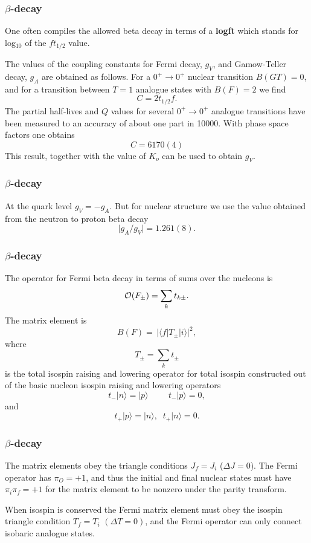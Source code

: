 \documentclass{beamer}
\begin{document}
\begin{frame}
\frametitle{$\beta$-decay}

\begin{block}{}
One often compiles the allowed beta decay in terms of a \textbf{logft}
which stands for log$_{10}$ of the $ft_{1/2}$ value.

     The values of the coupling constants for Fermi decay,
$g_{V}$, and Gamow-Teller decay, $g_{A}$ are obtained as follows.
For a $0^{+} \rightarrow  0^{+}$ nuclear transition $B(GT)=0$, and for a
transition between $  T=1  $ analogue states with $B(F)=2$ we find 
\[
       C = 2 t_{1/2} f.  
\]
The partial half-lives and $Q$ values for several $0^{+} \rightarrow  0^{+}$ analogue
transitions have been measured to an accuracy of about one part in
10000. With  phase space factors one obtains 
\[
      C = 6170(4)    
\]
This result, together with the value of $K_{o}$ can be used to obtain $g_{V}$.
\end{block}
\end{frame}

\begin{frame}
\frametitle{$\beta$-decay}

\begin{block}{}
At the quark level $g_{V}=-g_{A}$.
But for nuclear structure we use the value obtained from the
neutron to proton beta decay
\[
     \vert g_{A}/g_{V}\vert  = 1.261(8). 
\]
\end{block}
\end{frame}

\begin{frame}
\frametitle{$\beta$-decay}

\begin{block}{}
The operator for Fermi beta decay in terms of sums
over the nucleons is
\[
{\cal O}(F_{\pm}) =  \displaystyle\sum _{k} t_{k\pm}.
\]
The matrix element is
\[
B(F) =\, \vert \langle f\vert  T_{\pm} \vert i\rangle\vert ^{2}, 
\]
where
\[
T_{\pm} = \sum _{k} t_{\pm}  
\]
is the total isospin raising and lowering operator for total
isospin constructed out of the
basic nucleon isospin raising and lowering operators
\[
t_{-}\vert n\rangle=\vert p\rangle \hspace{1cm} t_{-}\vert p\rangle= 0,
\]
and
\[
t_{+}\vert p\rangle=\vert n\rangle, \;\; t_{+}\vert n\rangle= 0.  
\]
\end{block}
\end{frame}

\begin{frame}
\frametitle{$\beta$-decay}

\begin{block}{}
The matrix elements obey the triangle
conditions $J_{f}=J_{i}$ ($\Delta J=0$). The Fermi operator has
$\pi _{O}=+1$, and thus the
initial and final nuclear states must have $\pi _{i}\pi _{f}=+1$ for
the matrix element to be
nonzero under the parity transform.

When isospin is conserved
the Fermi matrix element must obey the isospin triangle condition
$T_{f}=T_{i}$ $(\Delta T=0)$, and the Fermi operator can only connect
isobaric analogue states.
\end{block}
\end{frame}
\end{document}
